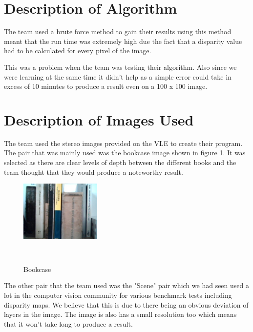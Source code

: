 \documentclass[twocolumn]{article}
\begin{document}
\section{Description of Algorithm}
\vspace{-1ex}

The team used a brute force method to gain their results using this method meant that the run time was extremely high due the fact that a disparity value had to be calculated for every pixel of the image. 

This was a problem when the team was testing their algorithm. Also since we were learning at the same time it didn't help as a simple error could take in excess of 10 minutes to produce a result even on a 100 x 100 image. 




\section{Description of Images Used}
\vspace{-1ex}

The team used the stereo images provided on the VLE to create their program. The pair that was mainly used was the bookcase image shown in figure \ref{fig:testR}. It was selected as there are clear levels of depth between the different books and the team thought that they would produce a noteworthy result. 

\begin{figure}[H]
\centering
  \includegraphics[width=40mm]{Figures/testR}
    \caption{Bookcase}~\label{fig:testR}
\end{figure} 

The other pair that the team used was the "Scene" pair which we had seen used a lot in the computer vision community \cite{sceneusage} \cite{sceneusage2} for various benchmark tests including disparity maps. We believe that this is due to there being an obvious deviation of layers in the image. The image is also has a small resolution too which means that it won't take long to produce a result.  
\end{document}
